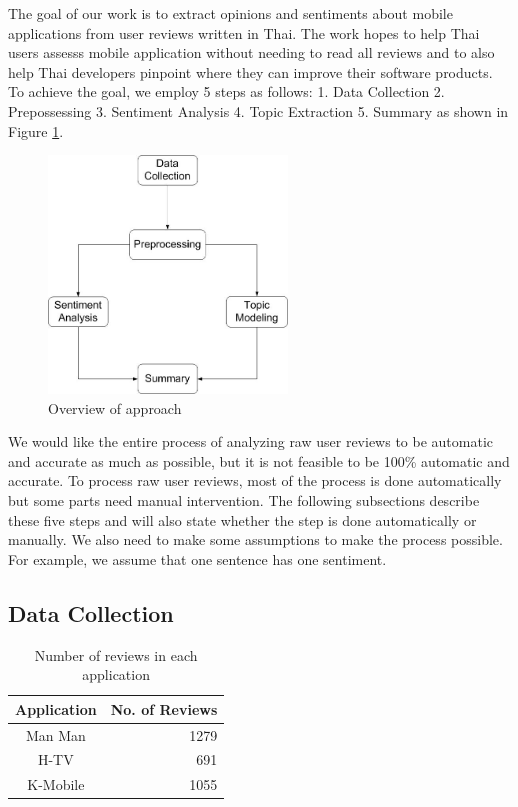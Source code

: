 
The goal of our work is to extract opinions and sentiments about mobile applications from user reviews written in Thai. The work hopes to help Thai users assesss mobile application without needing to read all reviews and to also help Thai developers pinpoint where they can improve their software products. To achieve the goal, we employ 5 steps as follows: 1. Data Collection 2. Prepossessing 3. Sentiment Analysis 4. Topic Extraction 5. Summary as shown in Figure \ref{fig:approachFig}. 

\begin{figure}[h]
	\centering
	\includegraphics[width=2.5in]{Process.jpg}
	\caption{Overview of approach}
	\label{fig:approachFig}
\end{figure}

We would like the entire process of analyzing raw user reviews to be automatic and accurate as much as possible, but it is not feasible to be 100\% automatic and accurate. To process raw user reviews, most of the process is done automatically but some parts need manual intervention. The following subsections describe these five steps and will also state whether the step is done automatically or manually. We also need to make some assumptions to make the process possible. For example, we assume that one sentence has one sentiment.

\subsection{Data Collection}

\begin{table}[h]
	\caption{Number of reviews in each application}
	\label{table:NoOfReview}
	\centering
	\begin{tabular}{|c|r|}
		\hline
		\textbf{Application} & \multicolumn{1}{|c|}{\textbf{No. of Reviews}} \\
		\hline
		Man Man & 1279\\
		\hline
		H-TV & 691\\
		\hline
		K-Mobile & 1055\\
		\hline
	\end{tabular}
\end{table}

